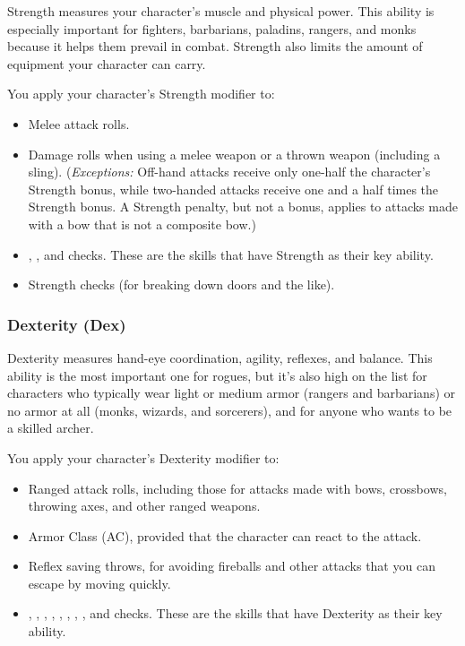 Strength measures your character's muscle and physical power. This ability is especially 
important for fighters, barbarians, paladins, rangers, and monks because it helps 
them prevail in combat. Strength also limits the amount of equipment your character 
can carry.

You apply your character's Strength modifier to:
\begin{itemize}
\item Melee attack rolls.
\item Damage rolls when using a melee weapon or a thrown weapon (including a sling). 
(\textit{Exceptions:} Off-hand attacks receive only one-half the character's Strength 
bonus, while two-handed attacks receive one and a half times the Strength bonus. 
A Strength penalty, but not a bonus, applies to attacks made with a bow that is 
not a composite bow.)
\item {}, , and  checks. These are the skills that have Strength as their 
key ability.
\item Strength checks (for breaking down doors and the like).
\end{itemize}

\subsubsection{Dexterity (Dex)}

Dexterity measures hand-eye coordination, agility, reflexes, and balance. This 
ability is the most important one for rogues, but it's also high on the list for 
characters who typically wear light or medium armor (rangers and barbarians) or 
no armor at all (monks, wizards, and sorcerers), and for anyone who wants to be 
a skilled archer.

You apply your character's Dexterity modifier to:
\begin{itemize}
\item Ranged attack rolls, including those for attacks made with bows, crossbows, throwing 
axes, and other ranged weapons.
\item Armor Class (AC), provided that the character can react to the attack.
\item Reflex saving throws, for avoiding fireballs and other attacks that you can escape 
by moving quickly.
\item {}, , , , , , , 
, and  checks. These are the skills that have Dexterity as their 
key ability.
\end{itemize}

